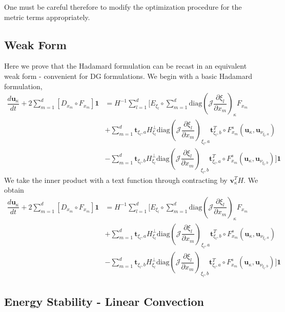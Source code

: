 \documentclass[12pt,a4paper]{article}
\newcommand{\pder}[2][]{\dfrac{\partial #1}{\partial #2}} %
\newcommand{\der}[2][]{\dfrac{d #1}{d #2}} %
\newcommand{\fn}[1]{\mathcal{#1}} %
\begin{document}
One must be careful therefore to modify the optimization procedure for the metric terms appropriately.

\subsection{Weak Form}

Here we prove that the Hadamard formulation can be recast in an equivalent weak form - convenient for DG formulations. We begin with a basic Hadamard formulation,
\begin{align*}
\der[\bm{u}_\kappa]{t} + 2 \sum_{m=1}^d \left[ D_{x_m} \circ F_{x_m} \right] \bm{1}  
&= H^{-1} \sum_{l=1}^d \Bigg[ E_{\xi_l} \circ \sum_{m=1}^d \text{diag} \left( \fn{J} \pder[\xi_l]{x_m} \right)_{\kappa} F_{x_m} \\
&  + \sum_{m=1}^d \bm{t}_{\xi_l, a} H^{\bot}_{\xi_l} \text{diag} \left( \fn{J} \pder[\xi_l]{x_m} \right)_{\xi_l,a} \bm{t}_{\xi_l, b}^T \circ  F^s_{x_m} (\bm{u}_\kappa, \bm{u}_{\nu_{\xi_l,a}}) \\
& - \sum_{m=1}^d \bm{t}_{\xi_l, b} H^{\bot}_{\xi_l}  \text{diag} \left( \fn{J} \pder[\xi_l]{x_m} \right)_{\xi_l,b} \bm{t}_{\xi_l, a}^T \circ F^s_{x_m} (\bm{u}_\kappa, \bm{u}_{\nu_{\xi_l,b}})
\Bigg] \bm{1}
\end{align*}
We take the inner product with a text function through contracting by $\bm{v}_\kappa^T H$. We obtain
\begin{align*}
\der[\bm{u}_\kappa]{t} + 2 \sum_{m=1}^d \left[ D_{x_m} \circ F_{x_m} \right] \bm{1}  
&= H^{-1} \sum_{l=1}^d \Bigg[ E_{\xi_l} \circ \sum_{m=1}^d \text{diag} \left( \fn{J} \pder[\xi_l]{x_m} \right)_{\kappa} F_{x_m} \\
&  + \sum_{m=1}^d \bm{t}_{\xi_l, a} H^{\bot}_{\xi_l} \text{diag} \left( \fn{J} \pder[\xi_l]{x_m} \right)_{\xi_l,a} \bm{t}_{\xi_l, b}^T \circ  F^s_{x_m} (\bm{u}_\kappa, \bm{u}_{\nu_{\xi_l,a}}) \\
& - \sum_{m=1}^d \bm{t}_{\xi_l, b} H^{\bot}_{\xi_l}  \text{diag} \left( \fn{J} \pder[\xi_l]{x_m} \right)_{\xi_l,b} \bm{t}_{\xi_l, a}^T \circ F^s_{x_m} (\bm{u}_\kappa, \bm{u}_{\nu_{\xi_l,b}})
\Bigg] \bm{1}
\end{align*}

\subsection{Energy Stability - Linear Convection}
\end{document}
